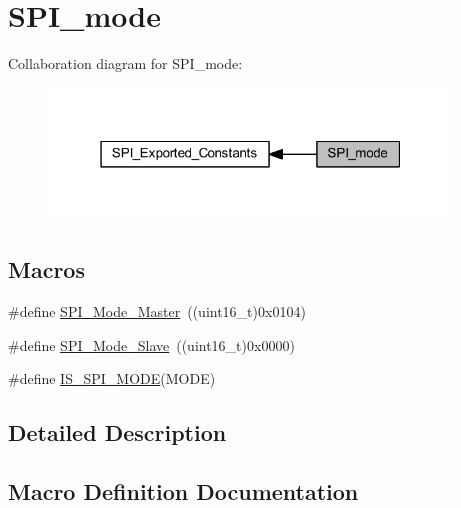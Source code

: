 \hypertarget{group___s_p_i__mode}{}\section{S\+P\+I\+\_\+mode}
\label{group___s_p_i__mode}
Collaboration diagram for S\+P\+I\+\_\+mode\+:
\nopagebreak
\begin{figure}[H]
\begin{center}
\leavevmode
\includegraphics[width=304pt]{group___s_p_i__mode}
\end{center}
\end{figure}
\subsection*{Macros}
\begin{DoxyCompactItemize}
\item 
\#define \hyperlink{group___s_p_i__mode_gaa9e47fb7c1d6c4655b72a00ed1f3b651}{S\+P\+I\+\_\+\+Mode\+\_\+\+Master}~((uint16\+\_\+t)0x0104)
\item 
\#define \hyperlink{group___s_p_i__mode_ga84621141413ee07cb2d2dc82da2baa42}{S\+P\+I\+\_\+\+Mode\+\_\+\+Slave}~((uint16\+\_\+t)0x0000)
\item 
\#define \hyperlink{group___s_p_i__mode_gad5135300763c75dbb446861536359f12}{I\+S\+\_\+\+S\+P\+I\+\_\+\+M\+O\+DE}(M\+O\+DE)
\end{DoxyCompactItemize}


\subsection{Detailed Description}


\subsection{Macro Definition Documentation}
\mbox{\label{group___s_p_i__mode_gad5135300763c75dbb446861536359f12}} 
